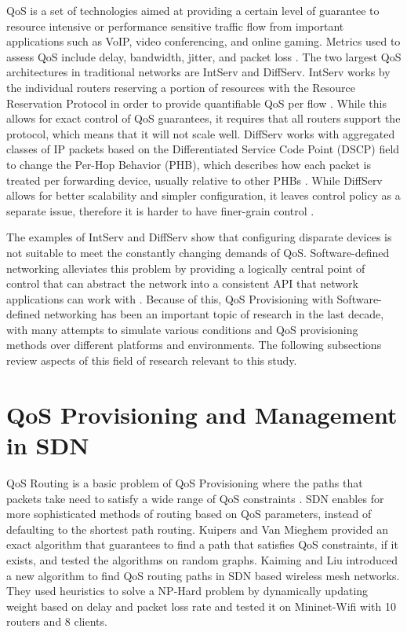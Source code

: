 QoS is a set of technologies aimed at providing a certain level of guarantee to resource intensive or performance sensitive traffic flow from important applications such as VoIP, video conferencing, and online gaming. Metrics used to assess QoS include delay, bandwidth, jitter, and packet loss \cite{karakus_quality_2017}. The two largest QoS architectures in traditional networks are IntServ and DiffServ. IntServ works by the individual routers reserving a portion of resources with the Resource Reservation Protocol in order to provide quantifiable QoS per flow \cite{braden_rfc1633_1994}. While this allows for exact control of QoS guarantees, it requires that all routers support the protocol, which means that it will not scale well. DiffServ works with aggregated classes of IP packets based on the Differentiated Service Code Point (DSCP) field to change the Per-Hop Behavior (PHB), which describes how each packet is treated per forwarding device, usually relative to other PHBs \cite{blake_rfc2475_1998}. While DiffServ allows for better scalability and simpler configuration, it leaves control policy as a separate issue, therefore it is harder to have finer-grain control \cite{zhao_internet_2000}.

The examples of IntServ and DiffServ show that configuring disparate devices is not suitable to meet the constantly changing demands of QoS. Software-defined networking alleviates this problem by providing a logically central point of control that can abstract the network into a consistent API that network applications can work with \cite{kreutz_software-defined_2015}. Because of this, QoS Provisioning with Software-defined networking has been an important topic of research in the last decade, with many attempts to simulate various conditions and QoS provisioning methods over different platforms and environments. The following subsections review aspects of this field of research relevant to this study.

\section{QoS Provisioning and Management in SDN}

QoS Routing is a basic problem of QoS Provisioning where the paths that packets take need to satisfy a wide range of QoS constraints \cite{zheng_wang_quality--service_1996}. SDN enables for more sophisticated methods of routing based on QoS parameters, instead of defaulting to the shortest path routing. Kuipers and Van Mieghem \cite{goos_qos_2001} provided an exact algorithm that guarantees to find a path that satisfies QoS constraints, if it exists, and tested the algorithms on random graphs. Kaiming and Liu \cite{kaiming_liu_novel_2016} introduced a new algorithm to find QoS routing paths in SDN based wireless mesh networks. They used heuristics to solve a NP-Hard problem by dynamically updating weight based on delay and packet loss rate and tested it on Mininet-Wifi with 10 routers and 8 clients.

